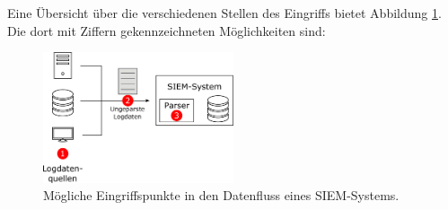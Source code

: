 Eine Übersicht über die verschiedenen Stellen des Eingriffs bietet Abbildung \ref{fig:siem_data_access_point}. Die dort mit Ziffern gekennzeichneten Möglichkeiten sind:

\begin{figure}[]
    \centering
        \includegraphics[width=0.5\textwidth]{dia/siem_data_access_point.pdf}
    \caption{Mögliche Eingriffspunkte in den Datenfluss eines SIEM-Systems.}
    \label{fig:siem_data_access_point}
\end{figure}

